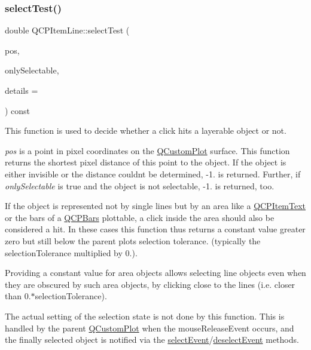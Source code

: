 \mbox{\label{class_q_c_p_item_line_a8e02bfbca04fbcf3dbc375a2bf693229}} 
\subsubsection{\texorpdfstring{select\+Test()}{selectTest()}}
{\footnotesize\ttfamily double Q\+C\+P\+Item\+Line\+::select\+Test (\begin{DoxyParamCaption}\item[{const Q\+PointF \&}]{pos,  }\item[{bool}]{only\+Selectable,  }\item[{Q\+Variant $\ast$}]{details = {} }\end{DoxyParamCaption}) const\hspace{0.3cm}{\ttfamily [virtual]}}

This function is used to decide whether a click hits a layerable object or not.

{\itshape pos} is a point in pixel coordinates on the \hyperlink{class_q_custom_plot}{Q\+Custom\+Plot} surface. This function returns the shortest pixel distance of this point to the object. If the object is either invisible or the distance couldn\textquotesingle{}t be determined, -\/1. is returned. Further, if {\itshape only\+Selectable} is true and the object is not selectable, -\/1. is returned, too.

If the object is represented not by single lines but by an area like a \hyperlink{class_q_c_p_item_text}{Q\+C\+P\+Item\+Text} or the bars of a \hyperlink{class_q_c_p_bars}{Q\+C\+P\+Bars} plottable, a click inside the area should also be considered a hit. In these cases this function thus returns a constant value greater zero but still below the parent plot\textquotesingle{}s selection tolerance. (typically the selection\+Tolerance multiplied by 0.).

Providing a constant value for area objects allows selecting line objects even when they are obscured by such area objects, by clicking close to the lines (i.\+e. closer than 0.$\ast$selection\+Tolerance).

The actual setting of the selection state is not done by this function. This is handled by the parent \hyperlink{class_q_custom_plot}{Q\+Custom\+Plot} when the mouse\+Release\+Event occurs, and the finally selected object is notified via the \hyperlink{class_q_c_p_abstract_item_aa4b969c58797f39c9c0b6c07c7869d17}{select\+Event}/\hyperlink{class_q_c_p_abstract_item_af9093798cb07a861dcc73f93ca16c0c1}{deselect\+Event} methods.

